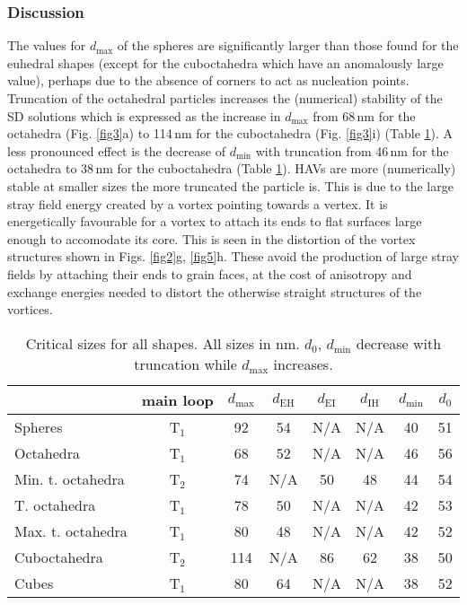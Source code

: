 \documentclass[review,authoryear]{elsarticle}
\newcommand{\dmax}{d_\text{max}}
\newcommand{\dmin}{d_\text{min}}
\newcommand{\nm}{\,\text{nm}}
\begin{document}
\subsubsection{Discussion}
The values for $\dmax$ of the spheres are significantly larger than those found for the euhedral shapes (except for the cuboctahedra which have an anomalously large value), perhaps due to the absence of corners to act as nucleation points. Truncation of the octahedral particles increases the (numerical) stability of the SD solutions which is expressed as the increase in $\dmax$ from 68$\nm$ for the octahedra (Fig. \ref{fig3}a) to 114$\nm$ for the cuboctahedra (Fig. \ref{fig3}i) (Table \ref{table1}). A less pronounced effect is the decrease of $\dmin$ with truncation from 46$\nm$ for the octahedra to 38$\nm$ for the cuboctahedra (Table \ref{table1}). HAVs are more (numerically) stable at smaller sizes the more truncated the particle is. This is due to the large stray field energy created by a vortex pointing towards a vertex. It is energetically favourable for a vortex to attach its ends to flat surfaces large enough to accomodate its core. This is seen in the distortion of the vortex structures shown in Figs. \ref{fig2}g, \ref{fig5}h. These avoid the production of large stray fields by attaching their ends to grain faces, at the cost of anisotropy and exchange energies needed to distort the otherwise straight structures of the vortices.\par
\begin{table}[ht]
\centering
\begin{tabular}{| l || c | c | c | c | c | c | c |}
\hline
       & main loop & $\dmax$ & $d_\text{EH}$ & $d_\text{EI}$ & $d_\text{IH}$ & $\dmin$ & $d_0$ \\
\hline
Spheres & T$_1$ & 92 & 54 & N/A & N/A & 40 & 51 \\
\hline
Octahedra & T$_1$ & 68 & 52 & N/A & N/A & 46 & 56 \\
\hline
Min. t. octahedra & T$_2$ & 74 & N/A & 50 & 48 & 44 & 54 \\
\hline
T. octahedra & T$_1$ & 78 & 50 & N/A & N/A & 42 & 53 \\
\hline
Max. t. octahedra & T$_1$ & 80 & 48 & N/A & N/A & 42 & 52 \\
\hline
Cuboctahedra & T$_2$ & 114 & N/A & 86 & 62 & 38 & 50 \\
\hline
Cubes & T$_1$ & 80 & 64 & N/A & N/A & 38 & 52 \\
\hline
\end{tabular}
\caption{Critical sizes for all shapes. All sizes in nm. $d_0$, $\dmin$ decrease with truncation while $\dmax$ increases.}
\label{table1}
\end{table}
\end{document}

